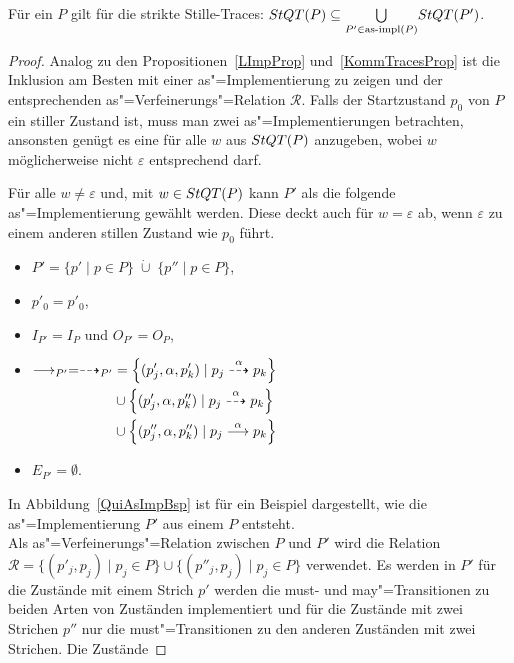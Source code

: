 \begin{Prop}
  \label{StilleTraceProp}
  Für ein \MEIO{} $P$ gilt für die strikte Stille-Traces: $StQT (P) \subseteq
  \underset{P'\in\mathrm{as}\text{-}\mathrm{impl} (P)}{\bigcup} StQT (P')$.
\end{Prop}
\begin{proof}
  Analog zu den Propositionen~\ref{LImpProp} und~\ref{KommTracesProp} ist die
  Inklusion am Besten mit einer as"=Implementierung zu zeigen und der
  entsprechenden as"=Verfeinerungs"=Relation $\mathcal{R}$. Falls der
  Startzustand $p_0$ von $P$ ein stiller Zustand ist, muss man zwei
  as"=Implementierungen betrachten, ansonsten genügt es eine für alle $w$ aus
  $StQT (P)$ anzugeben, wobei $w$ möglicherweise nicht $\varepsilon$
  entsprechend darf.

  Für alle $w\neq \varepsilon$ und, mit $w\in StQT (P)$ kann $P'$ als die
  folgende as"=Implementierung gewählt werden. Diese deckt auch für $w =
  \varepsilon$ ab, wenn $\varepsilon$ zu einem anderen stillen Zustand wie
  $p_0$ führt.
  \begin{itemize}
    \item $P'= \{p'\mid p\in P\}\; \dot{\cup}\; \{p''\mid p\in P\}$,
    \item $p'_0=p'_0$,
    \item $I_{P'}=I_P$ und $O_{P'}=O_P$,
    \item $\begin{aligned}[t] \must _{P'}=\may _{P'} &=
        \left\{(p'_j,\alpha ,p'_k)\mid p_j\may[\alpha] p_k\right\}\\
        &\cup \left\{(p'_j,\alpha ,p''_k)\mid p_j\may[\alpha] p_k\right\}\\
        &\cup \left\{(p''_j,\alpha ,p''_k)\mid p_j\must[\alpha] p_k\right\}
    \end{aligned}$
    \item $E_{P'}=\emptyset$.
  \end{itemize}
  In Abbildung~\ref{QuiAsImpBsp} ist für ein Beispiel dargestellt, wie die
  as"=Implementierung $P'$ aus einem \MEIO{} $P$ entsteht.\\
  Als as"=Verfeinerungs"=Relation zwischen $P$ und $P'$ wird die Relation
  $\mathcal{R}=\{(p'_j,p_j)\mid p_j\in P\} \cup \{(p''_j,p_j)\mid p_j\in P\}$
  verwendet. Es werden in $P'$ für die Zustände mit einem Strich $p'$ werden
  die must- und may"=Transitionen zu beiden \glqq Arten\grqq{} von Zuständen
  implementiert und für die Zustände mit zwei Strichen $p''$ nur die
  must"=Transitionen zu den anderen Zuständen mit zwei Strichen. Die Zustände

\end{proof}
